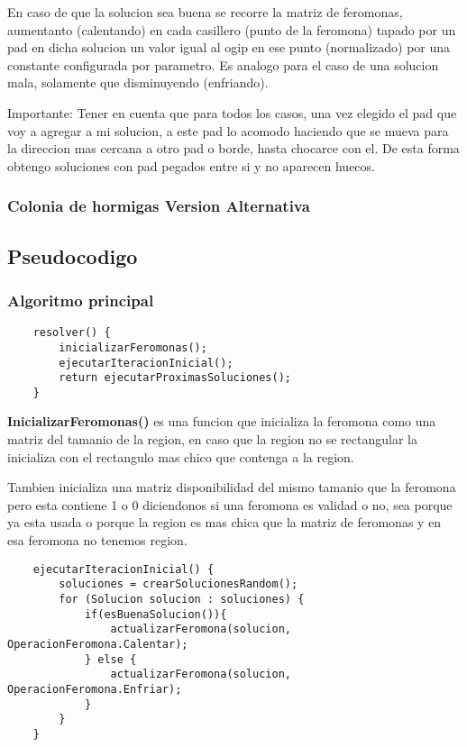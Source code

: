En caso de que la solucion sea buena se recorre la matriz de feromonas, aumentanto (calentando) en cada casillero (punto de la feromona) tapado por un pad en dicha solucion un valor igual al ogip en ese punto (normalizado) por una constante configurada por parametro. Es analogo para el caso de una solucion mala, solamente que disminuyendo (enfriando).


Importante: Tener en cuenta que para todos los casos, una vez elegido el pad que voy a agregar a mi solucion, a este pad lo acomodo haciendo que se mueva para la direccion mas cercana a otro pad o borde, hasta chocarce con el. De esta forma obtengo soluciones con pad pegados entre si y no aparecen huecos.


\subsubsection{Colonia de hormigas Version Alternativa}


\subsection{Pseudocodigo}
\subsubsection{Algoritmo principal}

\begin{verbatim}
    resolver() {
        inicializarFeromonas();
        ejecutarIteracionInicial();
        return ejecutarProximasSoluciones();
    }
\end{verbatim}

\textbf{InicializarFeromonas()} es una funcion que inicializa la feromona como una matriz del tamanio de la region, en caso que la region no se rectangular la inicializa con el rectangulo mas chico que contenga a la region. 

Tambien inicializa una matriz disponibilidad del mismo tamanio que la feromona pero esta contiene 1 o 0 diciendonos si una feromona es validad o no, sea porque ya esta usada o porque la region es mas chica que la matriz de feromonas y en esa feromona no tenemos region.


\begin{verbatim}
    ejecutarIteracionInicial() {
        soluciones = crearSolucionesRandom();
        for (Solucion solucion : soluciones) {
            if(esBuenaSolucion()){
                actualizarFeromona(solucion, OperacionFeromona.Calentar);
            } else {
                actualizarFeromona(solucion, OperacionFeromona.Enfriar);
            }
        }
    }
\end{verbatim}		

